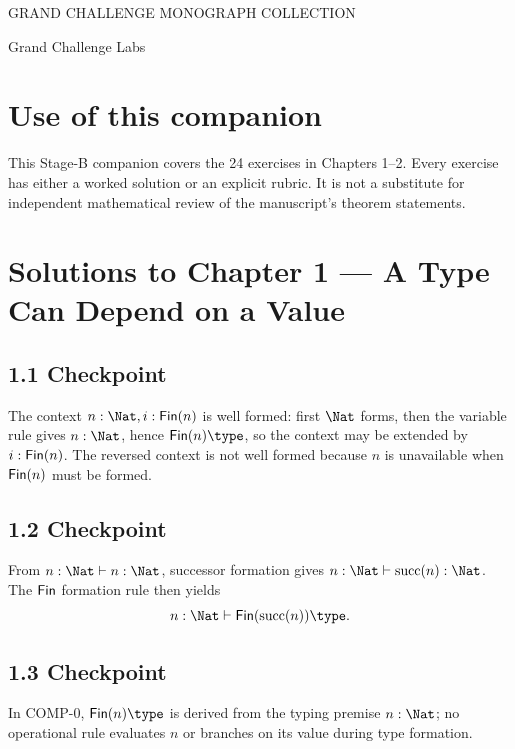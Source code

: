 \documentclass[11pt,openany]{book}
\begin{document}
\frontmatter
\begin{titlepage}
\pagecolor{GCLPale!35}\color{GCLInk}\centering
\vspace*{1.5cm}
{\small\sffamily GRAND CHALLENGE MONOGRAPH COLLECTION\par}
\vspace{0.8cm}{\Huge\bfseries COMPREHENSION\par}
\vspace{0.25cm}{\Large How Computational Worlds Are Built\par}
\vspace{0.4cm}{\large Volume II — Solutions Companion\par}
\vfill{\large Grand Challenge Labs\par}
\end{titlepage}
\nopagecolor\color{GCLInk}
\chapter*{Use of this companion}
This Stage-B companion covers the 24 exercises in Chapters 1–2. Every exercise has either a worked solution or an explicit rubric. It is not a substitute for independent mathematical review of the manuscript's theorem statements.
\tableofcontents
\mainmatter

\chapter{Solutions to Chapter 1 — A Type Can Depend on a Value}

\section*{1.1 Checkpoint}
The context $n:\Nat,i:\Fin(n)$ is well formed: first $\Nat$ forms, then the variable rule gives $n:\Nat$, hence $\Fin(n)\type$, so the context may be extended by $i:\mathsf{Fin}(n)$. The reversed context is not well formed because $n$ is unavailable when $\mathsf{Fin}(n)$ must be formed.

\section*{1.2 Checkpoint}
From $n:\Nat\vdash n:\Nat$, successor formation gives $n:\Nat\vdash \mathrm{succ}(n):\Nat$. The $\mathsf{Fin}$ formation rule then yields
\[
 n:\Nat\vdash \Fin(\mathrm{succ}(n))\type.
\]

\section*{1.3 Checkpoint}
In COMP-0, $\Fin(n)\type$ is derived from the typing premise $n:\Nat$; no operational rule evaluates $n$ or branches on its value during type formation.
\end{document}
